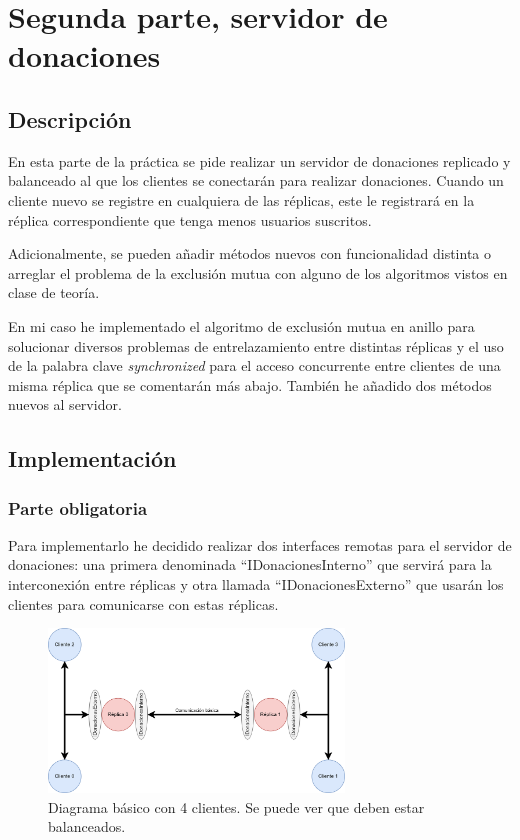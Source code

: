 \documentclass{article}
\begin{document}
\newpage

\section{Segunda parte, servidor de donaciones}
\subsection{Descripción}
En esta parte de la práctica se pide realizar un servidor de donaciones replicado y balanceado al que los clientes se conectarán para realizar donaciones. Cuando un cliente nuevo se registre en cualquiera de las réplicas, este le registrará en la réplica correspondiente que tenga menos usuarios suscritos.

Adicionalmente, se pueden añadir métodos nuevos con funcionalidad distinta o arreglar el problema de la exclusión mutua con alguno de los algoritmos vistos en clase de teoría.

\bigskip

En mi caso he implementado el algoritmo de exclusión mutua en anillo para solucionar diversos problemas de entrelazamiento entre distintas réplicas y el uso de la palabra clave \textit{synchronized} para el acceso concurrente entre clientes de una misma réplica que se comentarán más abajo. También he añadido dos métodos nuevos al servidor.
\subsection{Implementación}
\subsubsection{Parte obligatoria}

Para implementarlo he decidido realizar dos interfaces remotas para el servidor de donaciones: una primera denominada ``IDonacionesInterno'' que servirá para la interconexión entre réplicas y otra llamada ``IDonacionesExterno'' que usarán los clientes para comunicarse con estas réplicas.


\begin{figure}[H]
    \centering
    \includegraphics[width=0.7\textwidth]{imagenes/Parte 2 basico.png}
    \caption{Diagrama básico con 4 clientes. Se puede ver que deben estar balanceados.}
\end{figure}
\end{document}
